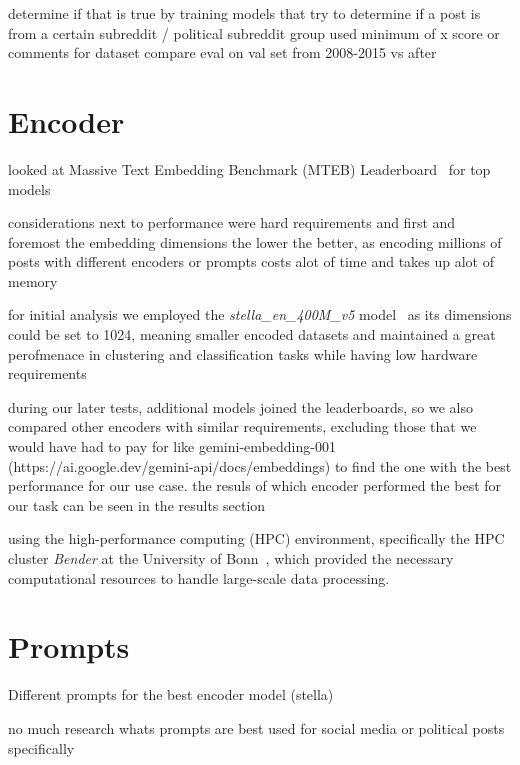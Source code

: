 determine if that is true by training models that try to determine if a post is from a certain subreddit / political subreddit group
used minimum of x score or comments for dataset
compare eval on val set from 2008-2015 vs after




\section{Encoder}

looked at Massive Text Embedding Benchmark (MTEB) Leaderboard~\cite{muennighoff2022mteb} for top models

considerations next to performance were hard requirements and first and foremost the embedding dimensions
the lower the better, as encoding millions of posts with different encoders or prompts costs alot of time and takes up alot of memory

for initial analysis we employed the \textit{stella\_en\_400M\_v5} model~\cite{stella_en_400M_v5} as its dimensions could be set to 1024, meaning smaller encoded datasets and maintained a great perofmenace in clustering and classification tasks while having low hardware requirements

during our later tests, additional models joined the leaderboards, so we also compared other encoders with similar requirements, excluding those that we would have had to pay for like gemini-embedding-001 (https://ai.google.dev/gemini-api/docs/embeddings) to find the one with the best performance for our use case. the resuls of which encoder performed the best for our task can be seen in the results section


using the high-performance computing (HPC) environment, specifically the HPC cluster \textit{Bender} at the University of Bonn~\cite{benderhpc}, which provided the necessary computational resources to handle large-scale data processing.


\section{Prompts}

Different prompts for the best encoder model (stella)

no much research whats prompts are best used for social media or political posts specifically

